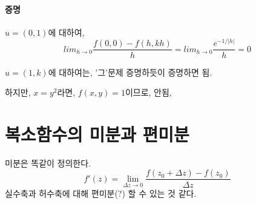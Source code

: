\paragraph{증명}
$u=(0,1)$에 대하여,
$$lim_{h \to 0} \frac{f(0,0)-f(h,kh)}{h} = lim_{h \to 0} \frac{e^{-1/|h|}}{h} = 0$$

$u=(1,k)$에 대하여는, '그'문제 증명하듯이 증명하면 됨.

하지만, $x=y^2$라면, $f(x,y)=1$이므로, 안됨,


\section{복소함수의 미분과 편미분}
미분은 똑같이 정의한다.
$$f'(z) = \lim_{\Delta z \to 0} \frac{f(z_0 + \Delta z) -f(z_0)}{\Delta z}$$
실수축과 허수축에 대해 편미분(?) 할 수 있는 것 같다.
